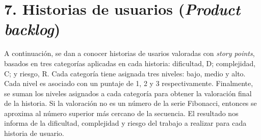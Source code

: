 \documentclass[
11pt, %
]{charter}
\begin{document}
\section{7. Historias de usuarios (\textit{Product backlog})}
\label{sec:backlog}

A continuación, se dan a conocer historias de usarios valoradas con \textit{story points}, basados en tres categorías aplicadas en cada historia: dificultad, D; complejidad, C; y riesgo, R. Cada categoría tiene asignada tres niveles: bajo, medio y alto. Cada nivel es asociado con un puntaje de 1, 2 y 3 respectivamente. Finalmente, se suman los niveles asignados a cada categoría para obtener la valoración final de la historia. Si la valoración no es un número de la serie Fibonacci, entonces se aproxima al número superior más cercano de la secuencia. El resultado nos informa de la dificultad, complejidad y riesgo del trabajo a realizar para cada historia de usuario.
\end{document}
